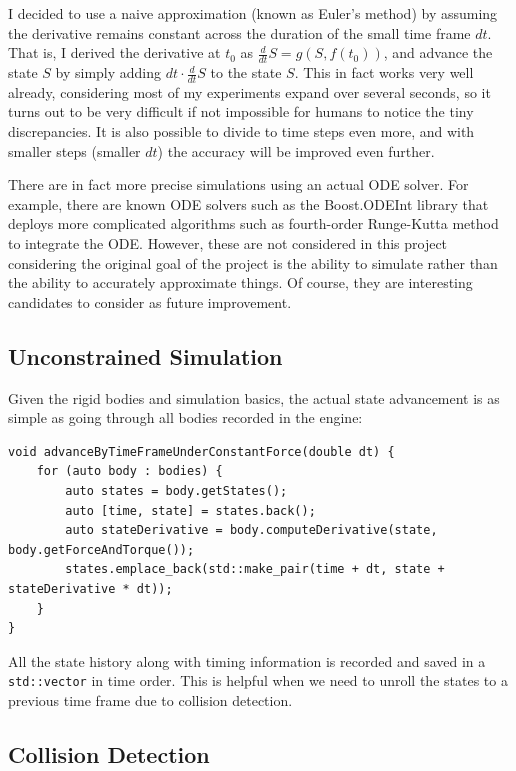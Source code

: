 \documentclass[12pt,a4paper,twoside,openright]{report}
\newcommand{\code}{\texttt}
\begin{document}
I decided to use a naive approximation (known as Euler's method) by assuming the derivative remains constant across the duration of the small time frame $dt$. That is, I derived the derivative at $t_0$ as $\frac{d}{dt}S=g(S, f(t_0))$, and advance the state $S$ by simply adding $dt \cdot \frac{d}{dt}S$ to the state $S$. This in fact works very well already, considering most of my experiments expand over several seconds, so it turns out to be very difficult if not impossible for humans to notice the tiny discrepancies. It is also possible to divide to time steps even more, and with smaller steps (smaller $dt$) the accuracy will be improved even further.

There are in fact more precise simulations using an actual ODE solver. For example, there are known ODE solvers such as the Boost.ODEInt library that deploys more complicated algorithms such as fourth-order Runge-Kutta method to integrate the ODE. However, these are not considered in this project considering the original goal of the project is the ability to simulate rather than the ability to accurately approximate things. Of course, they are interesting candidates to consider as future improvement.

\subsection{Unconstrained Simulation}\label{im4}

Given the rigid bodies and simulation basics, the actual state advancement is as simple as going through all bodies recorded in the engine:

\begin{verbatim}
void advanceByTimeFrameUnderConstantForce(double dt) {
    for (auto body : bodies) {
        auto states = body.getStates();
        auto [time, state] = states.back();
        auto stateDerivative = body.computeDerivative(state, body.getForceAndTorque());
        states.emplace_back(std::make_pair(time + dt, state + stateDerivative * dt));
    }
}
\end{verbatim}

All the state history along with timing information is recorded and saved in a \code{std::vector} in time order. This is helpful when we need to unroll the states to a previous time frame due to collision detection.

\subsection{Collision Detection}\label{im5}
\end{document}
